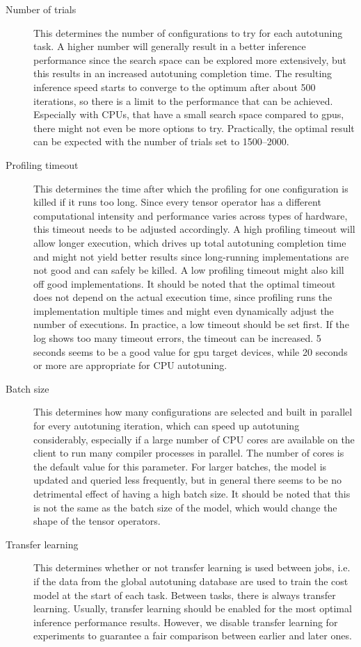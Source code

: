 \begin{description}
	\item[Number of trials] This determines the number of configurations to try for each autotuning task. A higher number will generally result in a better inference performance since the search space can be explored more extensively, but this results in an increased autotuning completion time. The resulting inference speed starts to converge to the optimum after about 500 iterations, so there is a limit to the performance that can be achieved. Especially with CPUs, that have a small search space compared to \glspl{gpu}, there might not even be more options to try. Practically, the optimal result can be expected with the number of trials set to 1500--2000.
	\item[Profiling timeout] This determines the time after which the profiling for one configuration is killed if it runs too long. Since every tensor operator has a different computational intensity and performance varies across types of hardware, this timeout needs to be adjusted accordingly. A high profiling timeout will allow longer execution, which drives up total autotuning completion time and might not yield better results since long-running implementations are not good and can safely be killed. A low profiling timeout might also kill off good implementations. It should be noted that the optimal timeout does not depend on the actual execution time, since profiling runs the implementation multiple times and might even dynamically adjust the number of executions. In practice, a low timeout should be set first. If the log shows too many timeout errors, the timeout can be increased. 5 seconds seems to be a good value for \gls{gpu} target devices, while 20 seconds or more are appropriate for CPU autotuning.
	\item[Batch size] This determines how many configurations are selected and built in parallel for every autotuning iteration, which can speed up autotuning considerably, especially if a large number of CPU cores are available on the client to run many compiler processes in parallel. The number of cores is the default value for this parameter. For larger batches, the model is updated and queried less frequently, but in general there seems to be no detrimental effect of having a high batch size. It should be noted that this is not the same as the batch size of the model, which would change the shape of the tensor operators.
	\item[Transfer learning] This determines whether or not transfer learning is used between jobs, i.e. if the data from the global autotuning database are used to train the cost model at the start of each task. Between tasks, there is always transfer learning. Usually, transfer learning should be enabled for the most optimal inference performance results. However, we disable transfer learning for experiments to guarantee a fair comparison between earlier and later ones.
\end{description}


